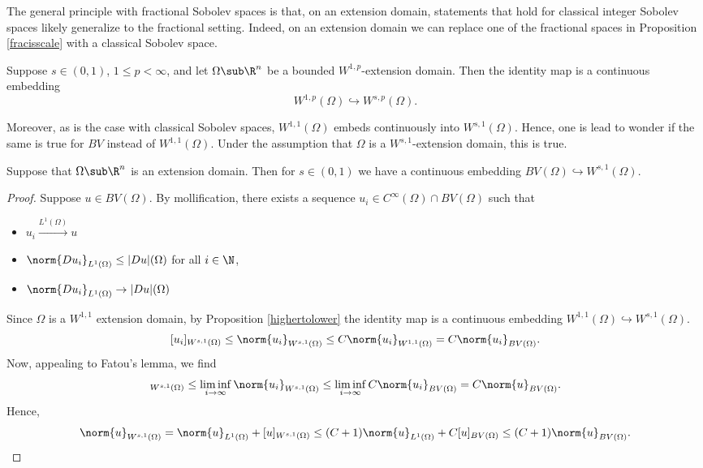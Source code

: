 \documentclass[../main.tex]{subfiles}
\begin{document}
The general principle with fractional Sobolev spaces is that, on an extension domain, statements that hold for classical integer Sobolev spaces likely generalize to the fractional setting. Indeed, on an extension domain we can replace one of the fractional spaces in Proposition \ref{fracisscale} with a classical Sobolev space.


\begin{proposition}\label{highertolower}
    Suppose $ s\in (0,1) $, $ 1\leq p <\infty $, and let $ \Omega\sub \R^{n} $ be a bounded $ W^{1,p} $-extension domain. Then the identity map is a continuous embedding 
    \[
        W^{1,p}(\Omega)\hookrightarrow W^{s,p}(\Omega).
    \]
\end{proposition}

 Moreover, as is the case with classical Sobolev spaces, $ W^{1,1}(\Omega) $ embeds continuously into $ W^{s,1}(\Omega) $. Hence, one is lead to wonder if the same is true for $ BV $ instead of $ W^{1,1}(\Omega) $. Under the assumption that $ \Omega $ is a $ W^{s,1} $-extension domain, this is true.


\begin{proposition}\label{BVinWs}
    Suppose that $ \Omega\sub \R^{n} $ is an extension domain. Then for $ s\in (0,1) $ we have a continuous embedding $ BV(\Omega)\hookrightarrow W^{s,1}(\Omega) $. 
\end{proposition}

\begin{proof}
    Suppose $ u\in BV(\Omega) $. By mollification, there exists a sequence $ u_{i}\in C^{\infty}(\Omega)\cap BV(\Omega) $ such that 
    \begin{itemize}
        \item $ u_{i}\xrightarrow{L^{1}(\Omega)}u $
        \item $ \norm{Du_{i}}_{L^{1}(\Omega)}  \leq |Du|(\Omega) $ for all $ i\in \N $,
        \item $ \norm{Du_{i}}_{L^{1}(\Omega)}\to |Du|(\Omega) $
    \end{itemize}
    Since $ \Omega $ is a $ W^{1,1} $ extension domain, by Proposition \ref{highertolower} the identity map is a continuous embedding $W^{1,1}(\Omega)\hookrightarrow W^{s,1}(\Omega) $.
    \[
        [u_{i}]_{W^{s,1}(\Omega)} \leq \norm{u_{i}}_{W^{s,1}(\Omega)} \leq C\norm{u_{i}}_{W^{1,1}(\Omega)} = C\norm{u_{i}}_{BV(\Omega)}.
    \]
    Now, appealing to Fatou's lemma, we find
    \begin{align*}
        [u]_{W^{s,1}(\Omega)} \leq \liminf_{i\to\infty} \norm{u_{i}}_{W^{s,1}(\Omega)} \leq \liminf_{i\to\infty} C \norm{u_{i}}_{BV(\Omega)} = C \norm{u}_{BV(\Omega)}.
    \end{align*}
    Hence, 
    \[
        \norm{u}_{W^{s,1}(\Omega)} = \norm{u}_{L^{1}(\Omega)}+ [u]_{W^{s,1}(\Omega)} \leq (C+1)\norm{u}_{L^{1}(\Omega)} +  C[u]_{BV(\Omega)} \leq (C+1)\norm{u}_{BV(\Omega)}.
    \]
\end{proof}
\end{document}
